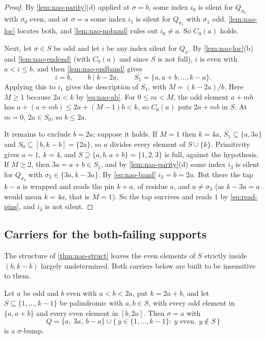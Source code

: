 \begin{proof}
By \autoref{lem:nao-parity}(d) applied at $\sigma=b$, some index $i_0$ is
silent for $Q_{\sigma_0}$ with $\sigma_0$ even, and at $\sigma=a$ some
index $i_1$ is silent for $Q_{\sigma_1}$ with $\sigma_1$ odd.
\autoref{lem:nao-loc} locates both, and \autoref{lem:nao-noband} rules out
$i_0\ne a$. So $C_0(a)$ holds.

Next, let $\sigma\in S$ be odd and let $i$ be any index silent for
$Q_\sigma$. By \autoref{lem:nao-loc}(b) and \autoref{lem:nao-endend} (with
$C_0(a)$ and since $S$ is not full), $i$ is even with $a<i\le b$, and then
\autoref{lem:nao-endband} gives
\begin{equation}
i=b,\qquad b\mid k-2a,\qquad S_1=\{a,a+b,\dots,k-a\}.
\label{eq:nao-band}
\end{equation}
Applying this to $i_1$ gives the description of $S_1$, with $M=(k-2a)/b$.
Here $M\ge1$ because $2a<k$ by \eqref{eq:nao-ab}. For $0\le m<M$, the odd
element $a+mb$ has $a+(a+mb)\le 2a+(M-1)b<k$, so $C_0(a)$ puts
$2a+mb$ in $S$. At $m=0$, $2a\in S_0$, so $b\le 2a$.

It remains to exclude $b=2a$; suppose it holds. If $M=1$ then $k=4a$,
$S_1\subseteq\{a,3a\}$ and $S_0\subseteq[b,k-b]=\{2a\}$, so $a$ divides
every element of $S\cup\{k\}$. Primitivity gives $a=1$, $k=4$, and
$S\supseteq\{a,b,a+b\}=\{1,2,3\}$ is full, against the hypothesis. If
$M\ge2$, then $3a=a+b\in S_1$, and by \autoref{lem:nao-parity}(d) some
index $i_3$ is silent for $Q_{\sigma_3}$ with $\sigma_3\in\{3a,k-3a\}$. By
\eqref{eq:nao-band} $i_3=b=2a$. But there the tap $k-a$ is wrapped and reads the
pin $k+a$, of residue $a$, and $a\ne\sigma_3$ (as $k-3a=a$ would mean $k=4a$,
that is $M=1$). So the tap survives and reads $1$ by
\eqref{eq:read-pins}, and $i_3$ is not silent.
\end{proof}

\subsection{Carriers for the both-failing supports}

The structure of \autoref{thm:nao-struct} leaves the even elements of $S$
strictly inside $(b,k-b)$ largely undetermined. Both carriers below are
built to be insensitive to them.

\begin{lemma}[the case $M=1$]
\label{lem:nao-bfone}
Let $a$ be odd and $b$ even with $a<b<2a$, put $k=2a+b$, and let
$S\subseteq\{1,\dots,k-1\}$ be palindromic with $a,b\in S$, with every odd
element in $\{a,a+b\}$ and every even element in $[b,2a]$. Then $\sigma=a$
with
\[
Q=\{a,\ 3a,\ b-a\}\cup\{\,y\in\{1,\dots,k-1\}:\ y \text{ even},\ y\notin S\,\}
\]
is a $\sigma$-bump.
\end{lemma}

